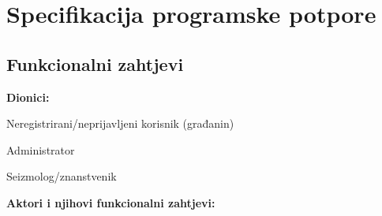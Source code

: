\chapter{Specifikacija programske potpore}
		
	\section{Funkcionalni zahtjevi}
			
			\noindent \textbf{Dionici:}
			
			\begin{packed_enum}
				
				\item Neregistrirani/neprijavljeni korisnik (građanin)
				\item Administrator				
				\item Seizmolog/znanstvenik
				
			\end{packed_enum}
			
			\noindent \textbf{Aktori i njihovi funkcionalni zahtjevi:}
			
